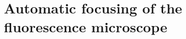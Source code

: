 \appendix
\chapter{Automatic focusing of the fluorescence microscope}
\label{app:A}



\printbibliography[title={References}]
